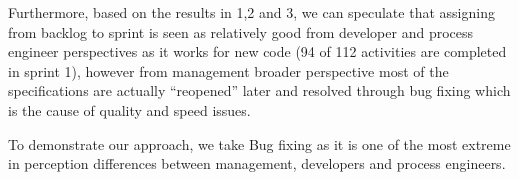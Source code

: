 Furthermore, based on the results in 1,2 and 3, we can speculate that assigning from backlog to sprint is seen as relatively good from developer and process engineer perspectives as it works for new code (94 of 112 activities are completed in sprint 1), however from management broader perspective most of the specifications are actually “reopened” later and resolved through bug fixing which is the cause of quality and speed issues.  


To demonstrate our approach, we take Bug fixing as it is one of the most extreme in perception differences between management, developers and process engineers. 

